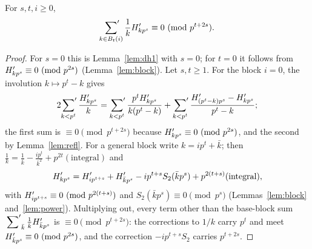 \documentclass[11pt]{amsart}
\begin{document}
\begin{lemma}\label{lem:dh2}
For $s,t,i\ge0$,
\[ \sideset{}{'}\sum_{k\in B_t(i)}\frac1kH'_{kp^s}\equiv0\ (\mathrm{mod}\ p^{t+2s}). \]
\end{lemma}
\begin{proof}
For $s=0$ this is Lemma~\ref{lem:dh1} with $s=0$; for $t=0$ it follows from $H'_{kp^s}\equiv0\ (\mathrm{mod}\ p^{2s})$ (Lemma~\ref{lem:block}). Let $s,t\ge1$. For the block $i=0$, the involution $k\mapsto p^t-k$ gives
\[ 2\sideset{}{'}\sum_{k<p^t}\frac{H'_{kp^s}}k=\sideset{}{'}\sum_{k<p^t}\frac{p^tH'_{kp^s}}{k(p^t-k)}+\sideset{}{'}\sum_{k<p^t}\frac{H'_{(p^t-k)p^s}-H'_{kp^s}}{p^t-k}; \]
the first sum is $\equiv0\pmod{p^{t+2s}}$ because $H'_{kp^s}\equiv0\ (\mathrm{mod}\ p^{2s})$, and the second by Lemma~\ref{lem:refl}. For a general block write $k=ip^t+\bar k$; then $\frac1k=\frac1{\bar k}-\frac{ip^t}{\bar k^2}+p^{2t}(\text{integral})$ and
\[ H'_{kp^s}=H'_{ip^{t+s}}+H'_{\bar kp^s}-ip^{t+s}S_2(\bar kp^s)+p^{2(t+s)}(\text{integral}), \]
with $H'_{ip^{t+s}}\equiv0\ (\mathrm{mod}\ p^{2(t+s)})$ and $S_2(\bar kp^s)\equiv0\pmod{p^s}$ (Lemmas~\ref{lem:block} and~\ref{lem:power}). Multiplying out, every term other than the base-block sum $\sideset{}{'}\sum_{\bar k}\frac1{\bar k}H'_{\bar kp^s}$ is $\equiv0\pmod{p^{t+2s}}$: the corrections to $1/k$ carry $p^t$ and meet $H'_{\bar kp^s}\equiv0\ (\mathrm{mod}\ p^{2s})$, and the correction $-ip^{t+s}S_2$ carries $p^{t+2s}$.
\end{proof}
\end{document}
